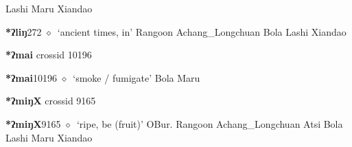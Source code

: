 \begin{list}{}{\leftmargin=1.5em \itemindent=-1.5em}
         Lashi 
\hspace{1ex}
         Maru 
\hspace{1ex}
         Xiandao 
  \item {\footnotesize \textbf{*ʔliŋ}}{\tiny 272}
\hspace{1ex}
         $\diamond$~`ancient times, in'
         Rangoon 
\hspace{1ex}
         Achang\_Longchuan 
\hspace{1ex}
         Bola 
\hspace{1ex}
         Lashi 
\hspace{1ex}
         Xiandao 
  \end{list}
\item
\textbf{*ʔmai}
  {\tiny crossid 10196}
  \begin{list}{}{\leftmargin=1.5em \itemindent=-1.5em}
  \item {\footnotesize \textbf{*ʔmai}}{\tiny 10196}
         $\diamond$~`smoke / fumigate'
         Bola 
\hspace{1ex}
         Maru 
  \end{list}
\item
\textbf{*ʔmiŋX}
  {\tiny crossid 9165}
  \begin{list}{}{\leftmargin=1.5em \itemindent=-1.5em}
  \item {\footnotesize \textbf{*ʔmiŋX}}{\tiny 9165}
         $\diamond$~`ripe, be (fruit)'
         OBur. 
\hspace{1ex}
         Rangoon 
\hspace{1ex}
         Achang\_Longchuan 
\hspace{1ex}
         Atsi 
\hspace{1ex}
         Bola 
\hspace{1ex}
         Lashi 
\hspace{1ex}
         Maru 
\hspace{1ex}
         Xiandao 
  \end{list}
